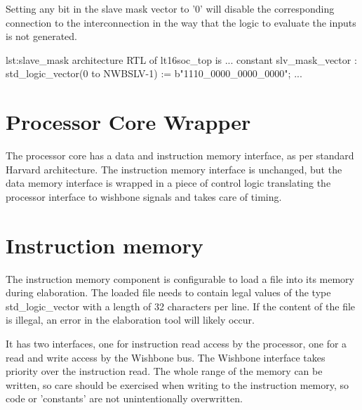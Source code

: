 Setting any bit in the slave mask vector to '0' will disable the corresponding connection to the interconnection in the way that the logic to evaluate the inputs is not generated.

\begin{vhdl}{lst:slave_mask}
architecture RTL of lt16soc_top is
...
constant slv_mask_vector : std_logic_vector(0 to NWBSLV-1) := b"1110_0000_0000_0000";
...
\end{vhdl}

\section{Processor Core Wrapper}
The processor core has a data and instruction memory interface, as per standard Harvard architecture.
The instruction memory interface is unchanged, but the data memory interface is wrapped in a piece of control logic translating the processor interface to wishbone signals and takes care of timing.

\section{Instruction memory}
The instruction memory component is configurable to load a file into its memory during elaboration.
The loaded file needs to contain legal values of the type std\_logic\_vector with a length of 32 characters per line.
If the content of the file is illegal, an error in the elaboration tool will likely occur.

It has two interfaces, one for instruction read access by the processor, one for a read and write access by the Wishbone bus.
The Wishbone interface takes priority over the instruction read.
The whole range of the memory can be written, so care should be exercised when writing to the instruction memory, 
so code or 'constants' are not unintentionally overwritten.
